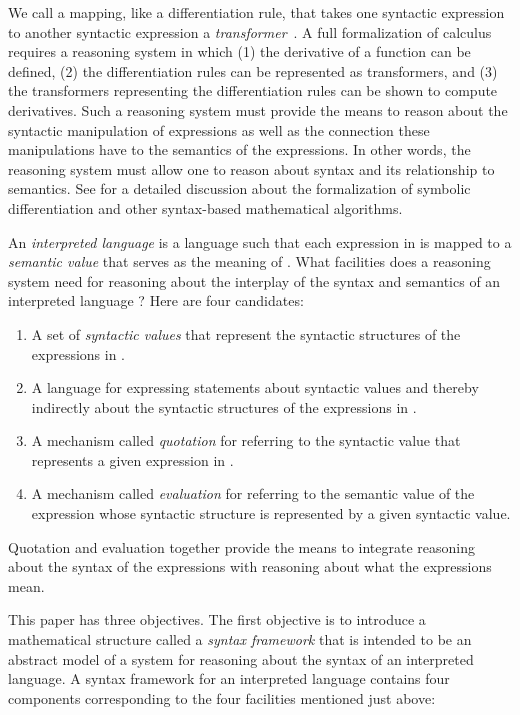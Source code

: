 \documentclass[11pt,fleqn]{article}
\newcommand{\be}{\begin{enumerate}}
\newcommand{\ee}{\end{enumerate}}
\newcommand{\bsp}{\begin{sloppypar}}
\newcommand{\esp}{\end{sloppypar}}
\begin{document}
We call a mapping, like a differentiation rule, that takes one
syntactic expression to another syntactic expression a
\emph{transformer}~\cite{FarmerMohrenschildt03}.  A full formalization
of calculus requires a reasoning system in which (1) the derivative of
a function can be defined, (2) the differentiation rules can be
represented as transformers, and (3) the transformers representing the
differentiation rules can be shown to compute derivatives.  Such a
reasoning system must provide the means to reason about the syntactic
manipulation of expressions as well as the connection these
manipulations have to the semantics of the expressions.  In other
words, the reasoning system must allow one to reason about syntax and
its relationship to semantics.  See \cite{Farmer13} for a detailed
discussion about the formalization of symbolic differentiation and
other syntax-based mathematical algorithms.

An \emph{interpreted language} is a language  such that each
expression  in  is mapped to a \emph{semantic value} that serves
as the meaning of .  What facilities does a reasoning system need
for reasoning about the interplay of the syntax and semantics of an
interpreted language ?  Here are four candidates:

\be

  \item A set of \emph{syntactic values} that represent the syntactic
    structures of the expressions in .

  \item \bsp A language for expressing statements about syntactic
    values and thereby indirectly about the syntactic structures of
    the expressions in .\esp

  \item A mechanism called \emph{quotation} for referring to the
    syntactic value that represents a given expression in .

  \item A mechanism called \emph{evaluation} for referring to the
    semantic value of the expression whose syntactic structure is
    represented by a given syntactic value.

\ee 
Quotation and evaluation together provide the means to integrate
reasoning about the syntax of the expressions with reasoning about
what the expressions mean.

This paper has three objectives.  The first objective is to introduce a
mathematical structure called a \emph{syntax framework} that is
intended to be an abstract model of a system for reasoning about the
syntax of an interpreted language.  A syntax framework for an
interpreted language  contains four components corresponding to the
four facilities mentioned just above:
\end{document}
